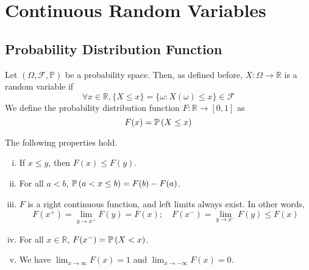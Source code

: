 \documentclass{article}
\begin{document}
\section{Continuous Random Variables}
\subsection{Probability Distribution Function}
Let $(\Omega, \mathcal F, \mathbb P)$ be a probability space. Then, as defined before, $X \colon \Omega \to \mathbb R$ is a random variable if
\[ \forall x \in \mathbb R, \{ X \leq x \} = \{ \omega \colon X(\omega) \leq x \} \in \mathcal F \]
We define the probability distribution function $F \colon \mathbb R \to [0, 1]$ as
\[ F(x) = \mathbb{P}\left({X \leq x}\right) \]
\begin{theorem}
    The following properties hold.
    \begin{enumerate}[(i)]
        \item If $x \leq y$, then $F(x) \leq F(y)$.
        \item For all $a < b$, $\mathbb{P}\left({a < x \leq b}\right) = F(b) - F(a)$.
        \item $F$ is a right continuous function, and left limits always exist. In other words,
              \[ F(x^+) = \lim_{y \to x^+} F(y) = F(x);\quad F(x^-) = \lim_{y \to x^-} F(y) \leq F(x) \]
        \item For all $x \in\mathbb R$, $F(x^-) = \mathbb{P}\left({X < x}\right)$.
        \item We have $\lim_{x \to \infty} F(x) = 1$ and $\lim_{x \to -\infty} F(x) = 0$.
    \end{enumerate}
\end{theorem}
\end{document}
